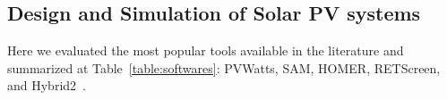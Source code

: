 \documentclass[review]{elsarticle}
\begin{document}


\subsection{Design and Simulation of Solar PV systems}
%
%
Here we evaluated the most popular tools available in the literature and summarized at Table~\ref{table:softwares}: PVWatts, SAM, HOMER, RETScreen, and Hybrid2~\cite{Pradhan,Swarnkar,NRELDobos,NRELBlair,Mills}.
\end{document}
